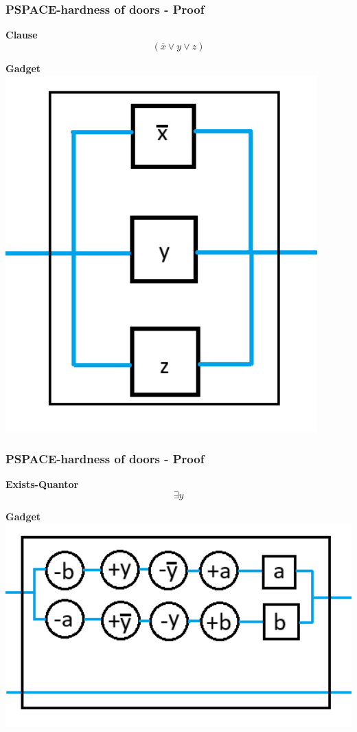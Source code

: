 \documentclass{beamer}
\begin{document}
\begin{frame}
  \frametitle{PSPACE-hardness of doors - Proof}
  \begin{minipage}[t]{0.45\textwidth}
    \textbf{Clause}
    \[ (\overline{x} \lor y \lor z) \]
  \end{minipage}
  \begin{minipage}[t]{0.45\textwidth}
    \textbf{Gadget}
    \includegraphics[width=0.9\textwidth]{res/ClauseGadget.png}
  \end{minipage}
\end{frame}

\begin{frame}
  \frametitle{PSPACE-hardness of doors - Proof}
  \begin{minipage}[t]{0.45\textwidth}
    \textbf{Exists-Quantor}
    \[ \exists y \]
  \end{minipage}
  \begin{minipage}[t]{0.45\textwidth}
    \textbf{Gadget}
    \includegraphics[width=1.3\textwidth]{res/ExsistsGadget.png}
  \end{minipage}
\end{frame}
\end{document}
